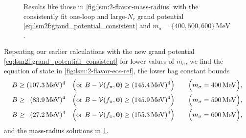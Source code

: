 \begin{figure}[t]
\caption{\label{fig:lsm:2-flavor-mass-radius-ref}%
Results like those in \cref{fig:lsm:2-flavor-mass-radius} with the consistently fit one-loop and large-$N_c$ grand potential \eqref{eq:lsm2f:grand_potential_consistent}
and $m_\sigma = \{400,500,600\} \, \si{\mega\electronvolt}$.
}
\end{figure}

Repeating our earlier calculations with the new grand potential \eqref{eq:lsm2f:grand_potential_consistent} for lower values of $m_\sigma$,
we find the equation of state in \cref{fig:lsm:2-flavor-eos-ref},
the lower bag constant bounds
\begin{subequations}
\begin{align}
	B \geq (\SI{107.3}{\mega\electronvolt})^4           \quad \Big(\text{or } B-\mathcal{V}(f_\pi,{\bm{0}}) \geq (\SI{145.4}{\mega\electronvolt})^4\Big) \qquad \Big(m_\sigma = \SI{400}{\mega\electronvolt}\Big), \\
	B \geq \phantom{0}(\SI{83.9}{\mega\electronvolt})^4 \quad \Big(\text{or } B-\mathcal{V}(f_\pi,{\bm{0}}) \geq (\SI{145.9}{\mega\electronvolt})^4\Big) \qquad \Big(m_\sigma = \SI{500}{\mega\electronvolt}\Big), \\
	B \geq \phantom{0}(\SI{27.2}{\mega\electronvolt})^4  \quad \Big(\text{or } B-\mathcal{V}(f_\pi,{\bm{0}}) \geq (\SI{155.3}{\mega\electronvolt})^4\Big) \qquad \Big(m_\sigma = \SI{600}{\mega\electronvolt}\Big),
\end{align}%
\label{eq:lsm:bag_lower_bound_ref}%
\end{subequations}
and the mass-radius solutions in \cref{fig:lsm:2-flavor-mass-radius-ref}.

